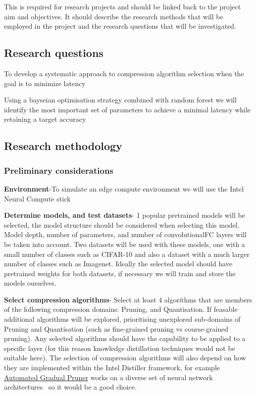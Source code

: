 \documentclass[../../D1.tex]{subfiles}
\begin{document}
This is required for research projects and should be linked
back to the project aim and objectives. It should describe the research methods that
will be employed in the project and the research questions that will be investigated.

\subsection{Research questions}


To develop a systematic approach to compression algorithm selection when the goal is to minimize latency

Using a bayseian optimisation strategy combined with random forest we will identify the most important set of parameters to achieve a minimal latency while retaining a target accuracy 

\subsection{Research methodology}

\subsubsection{Preliminary considerations}
\textbf{Environment}-To simulate an edge compute environment we will use the Intel Neural Compute stick

\textbf{Determine models, and test datasets}- 1 popular pretrained models will be selected, the model structure should be considered when selecting this model. Model depth, number of parameters, and number of convolutional\/FC layers will be taken into account. Two datasets will be used with these models, one with a small number of classes such as CIFAR-10 and also a dataset with a much larger number of classes such as Imagenet. Ideally the selected model should have pretrained weights for both datasets, if necessary we will train and store the models ourselves.

\textbf{Select compression algorithms}- Select at least 4 algorithms that are members of the following compression domains: Pruning, and Quantisation. If feasable additional algorithms will be explored, prioritising unexplored sub-domains of Pruning and Quantisation (such as fine-grained pruning vs course-grained pruning). Any selected algorithms should have the capability to be applied to a specific layer (for this reason knowledge distillation techniques would not be suitable here).
The selection of compression algorithms will also depend on how they are implemented within the Intel Distiller framework, for example \href{https://github.com/IntelLabs/distiller/blob/master/distiller/pruning/automated_gradual_pruner.py}{Automated Gradual Pruner} works on a diverse set of neural network architectures~\autocite{zhuPruneNotPrune2017} so it would be a good choice.
\end{document}
